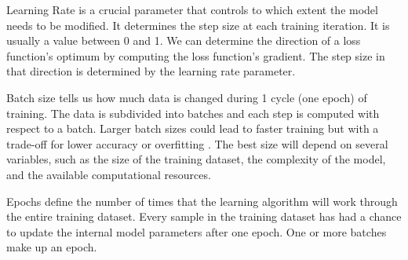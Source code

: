 	Learning Rate is a crucial parameter that controls to which extent the model needs to be modified. It determines the step size at each training iteration. It is usually a value between 0 and 1. We can determine the direction of a loss function's optimum by computing the loss function's gradient. The step size in that direction is determined by the learning rate parameter.
	
	Batch size tells us how much data is changed during 1 cycle (one epoch) of training. The data is subdivided into batches and each step is computed with respect to a batch. Larger batch sizes could lead to faster training but with a trade-off for lower accuracy or overfitting \cite{DBLP:journals/corr/abs-2006-08517}. The best size will depend on several variables, such as the size of the training dataset, the complexity of the model, and the available computational resources.
	
	Epochs define the number of times that the learning algorithm will work through the entire training dataset. Every sample in the training dataset has had a chance to update the internal model parameters after one epoch. One or more batches make up an epoch.

